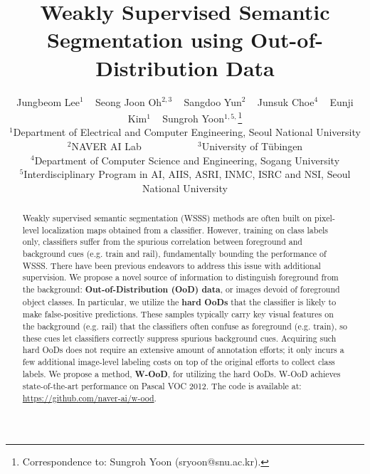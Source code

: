 \documentclass[10pt,twocolumn,letterpaper]{article}
\begin{document}
\title{Weakly Supervised Semantic Segmentation using Out-of-Distribution Data}

\author{Jungbeom Lee$^1$ ~ Seong Joon Oh$^{2, 3}$ ~ Sangdoo Yun$^2$ ~ Junsuk Choe$^4$ ~ Eunji Kim$^1$ ~  Sungroh Yoon$^{1, 5,}$\thanks{Correspondence to: Sungroh Yoon (sryoon@snu.ac.kr).}\\
\small
$^1$Department of Electrical and Computer Engineering, Seoul National University\\
\small
$^2$NAVER AI Lab ~~~~~~~~~~
$^3$University of T\"ubingen\\
\small
$^4$Department of Computer Science and Engineering, Sogang University\\
\small
$^5$Interdisciplinary Program in AI, AIIS, ASRI, INMC, ISRC and NSI, Seoul National University\\
}
\maketitle


\begin{abstract}
Weakly supervised semantic segmentation (WSSS) methods are often built on pixel-level localization maps obtained from a classifier. However, training on class labels only, classifiers suffer from the spurious correlation between foreground and background cues (e.g. train and rail), fundamentally bounding the performance of WSSS. 
There have been previous endeavors to address this issue with additional supervision.
We propose a novel source of information to distinguish foreground from the background: \textbf{Out-of-Distribution (OoD) data}, or images devoid of foreground object classes. 
In particular, we utilize the \textbf{hard OoDs} that the classifier is likely to make false-positive predictions.
These samples typically carry key visual features on the background (e.g. rail) that the classifiers often confuse as foreground (e.g. train), so these cues let classifiers correctly suppress spurious background cues.
Acquiring such hard OoDs does not require an extensive amount of annotation efforts; it only incurs a few additional image-level labeling costs on top of the original efforts to collect class labels.
We propose a method, \textbf{W-OoD}, for utilizing the hard OoDs. 
W-OoD achieves state-of-the-art performance on Pascal VOC 2012.
The code is available at: \url{https://github.com/naver-ai/w-ood}.


\end{abstract}

\vspace{-1em}
\end{document}
